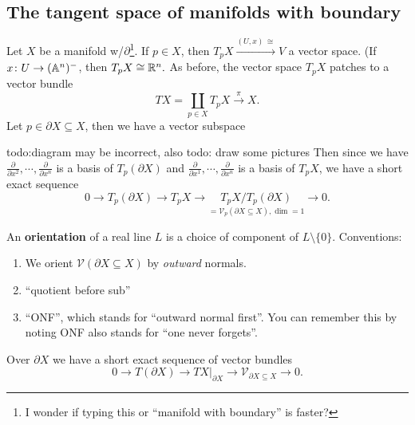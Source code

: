 \subsection{The tangent space of manifolds with boundary}
Let $X$ be a manifold w/$\partial $\footnote{I wonder if typing this or ``manifold with boundary'' is faster?}. If $p \in X$, then $T_p X \xrightarrow{ (U,x)\,\cong}V $ a vector space. (If $x \colon U \to (\mathbb{A}^n )^-$, then $T_p X \cong \mathbb{R}^n.$ As before, the vector space $T_p X$ patches to a vector bundle \[
TX= \coprod _{p \in X}T_p X \overset{\pi}{\longrightarrow} X.
\] Let $p \in \partial X \subseteq X$, then we have a vector subspace
\begin{figure}[H]
\centering
{}
\end{figure}
{\color{red}todo:diagram may be incorrect, also todo: draw some pictures} 
Then since we have $\frac{\partial }{\partial x^2},\cdots ,\frac{\partial }{\partial x^n }$ is a basis of $T_p (\partial X)$ and $\frac{\partial }{\partial x^1},\cdots ,\frac{\partial }{\partial x^n }$ is a basis of $T_p X$, we have a short exact sequence \[
    0 \longrightarrow T_p (\partial X) \longrightarrow T_p X \longrightarrow \underset{=\mathcal V_p(\partial X \subseteq X), \dim=1}{T_p X / T_p (\partial X)} \longrightarrow 0.
\] 
\begin{definition}[]
    An \textbf{orientation} of a real line $L$ is a choice of component of $L \setminus \{0\} $. Conventions:
    \begin{enumerate}[label=(\arabic*)]
        \item We orient $\mathcal{V} (\partial X \subseteq X)$ by \emph{outward} normals.
        \item ``quotient before sub''
        \item ``ONF'', which stands for ``outward normal first''. You can remember this by noting ONF also stands for ``one never forgets''.
    \end{enumerate}
\end{definition}
Over $\partial X$ we have a short exact sequence of vector bundles \[
    0 \longrightarrow T(\partial X) \longrightarrow TX |_{\partial X}\longrightarrow \mathcal{V} _{\partial X \subseteq X}\longrightarrow 0.
\] 

